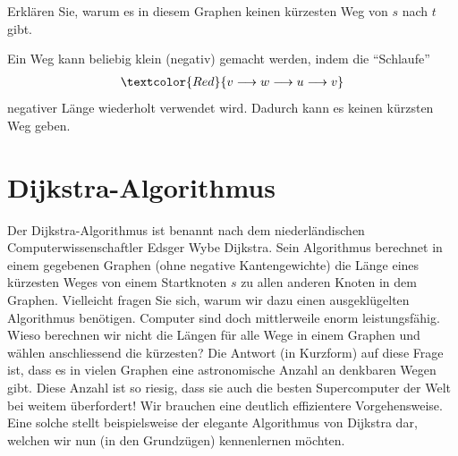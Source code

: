 \begin{myexercise}\label{aufgabe:204}
	\begin{figure}[H]
		\centering
	\end{figure}
	Erklären Sie, warum es in diesem Graphen keinen kürzesten Weg von $s$ nach $t$ gibt.
	\begin{myanswer}\label{aufgabe:204-sol}
		Ein Weg kann beliebig klein (negativ) gemacht werden, indem die \enquote{Schlaufe}
		\begin{align*}
			\textcolor{Red}{ v \longrightarrow w \longrightarrow u \longrightarrow v}
		\end{align*}
		negativer Länge wiederholt verwendet wird. Dadurch kann es keinen kürzsten Weg geben.
	\end{myanswer}
\end{myexercise}


\section{Dijkstra-Algorithmus}
Der Dijkstra-Algorithmus ist benannt nach dem niederländischen Computerwissenschaftler Edsger Wybe Dijkstra. Sein Algorithmus berechnet in einem gegebenen Graphen (ohne negative Kantengewichte) die Länge eines kürzesten Weges von einem Startknoten $s$ zu allen anderen Knoten in dem Graphen. Vielleicht fragen Sie sich, warum wir dazu einen ausgeklügelten Algorithmus benötigen. Computer sind doch mittlerweile enorm leistungsfähig. Wieso berechnen wir nicht die Längen für alle Wege in einem Graphen und wählen anschliessend die kürzesten? Die Antwort (in Kurzform) auf diese Frage ist, dass es in vielen Graphen eine astronomische Anzahl an denkbaren Wegen gibt. Diese Anzahl ist so riesig, dass sie auch die besten Supercomputer der Welt bei weitem überfordert! Wir brauchen eine deutlich effizientere Vorgehensweise. Eine solche stellt beispielsweise der elegante Algorithmus von Dijkstra dar, welchen wir nun (in den Grundzügen) kennenlernen möchten.

